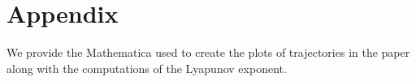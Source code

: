 \chapter{Appendix}
We provide the Mathematica used to create the plots of trajectories in the paper along with the computations of the Lyapunov exponent. 
